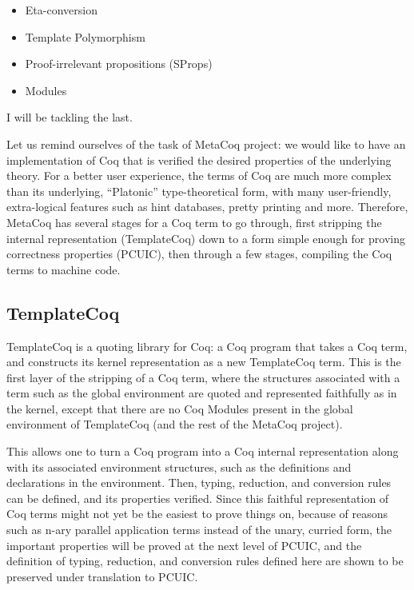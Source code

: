 \begin{itemize}
    \item Eta-conversion
    \item Template Polymorphism
    \item Proof-irrelevant propositions (SProps)
    \item Modules
\end{itemize}

I will be tackling the last.

Let us remind ourselves of the task of MetaCoq project: we would like to have an
implementation of Coq that is verified the desired properties of the underlying
theory. For a better user experience, the terms of Coq are much more complex
than its underlying, ``Platonic'' type-theoretical form, with many
user-friendly, extra-logical features such as hint databases, pretty printing
and more. Therefore, MetaCoq has several stages for a Coq term to go through,
first stripping the internal representation (TemplateCoq) down to a form simple
enough for proving correctness properties (PCUIC), then through a few stages,
compiling the Coq terms to machine code.

\subsection{TemplateCoq}
\label{sec:mc-template}

TemplateCoq is a quoting library for Coq: a Coq program that takes a Coq term,
and constructs its kernel representation as a new TemplateCoq term. This is the
first layer of the stripping of a Coq term, where the structures associated with
a term such as the global environment are quoted and represented faithfully as
in the kernel, except that there are no Coq Modules present in the global
environment of TemplateCoq (and the rest of the MetaCoq project).


This allows one to turn a Coq program into a Coq internal representation along
with its associated environment structures, such as the definitions and
declarations in the environment. Then, typing, reduction, and conversion rules
can be defined, and its properties verified. Since this faithful representation
of Coq terms might not yet be the easiest to prove things on, because of reasons
such as n-ary parallel application terms instead of the unary, curried form, the
important properties will be proved at the next level of PCUIC, and the
definition of typing, reduction, and conversion rules defined here are shown to
be preserved under translation to PCUIC.

